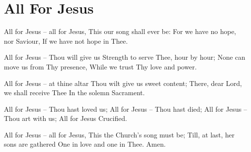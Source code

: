 \starttocol
\chapter{All For Jesus}
\nexttocol
\hfill{\it }
\stoptocol
\starttocol
\startlines
{\sc All}  for Jesus -- all for Jesus,
This our song shall ever be:
For we have no hope, nor Saviour,
If we have not hope in Thee.

All for Jesus -- Thou will give us
Strength to serve Thee, hour by hour;
None can move us from Thy presence,
While we trust Thy love and power.

All for Jesus -- at thine altar
Thou wilt give us sweet content;
There, dear Lord, we shall receive Thee
In the solemn Sacrament.

All for Jesus -- Thou hast loved us;
All for Jesus -- Thou hast died;
All for Jesus -- Thou art with us;
All for Jesus Crucified.

All for Jesus -- all for Jesus,
This the Church's song must be;
Till, at last, her sons are gathered
One in love and one in Thee.
          \hfill{Amen.}~~~~~~~~~
\stoplines
\nexttocol

\stoptocol
